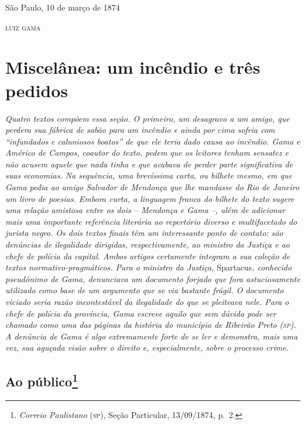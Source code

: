 \begin{flushright}
São Paulo, 10 de março de 1874

\textsc{luiz gama}
\end{flushright}

\part{Miscelânea: um incêndio e três pedidos}

\begin{argumento}
\emph{Quatro textos compõem essa seção. O primeiro, um desagravo a um
amigo, que perdera sua fábrica de sabão para um incêndio e ainda por
cima sofria com ``infundados e caluniosos boatos'' de que ele teria dado
causa ao incêndio. Gama e Américo de Campos, coautor do texto, pedem que
os leitores tenham sensatez e não acusem aquele que nada tinha e que
acabava de perder parte significativa de suas economias. Na sequência,
uma brevíssima carta, ou bilhete mesmo, em que Gama pedia ao amigo
Salvador de Mendonça que lhe mandasse do Rio de Janeiro um livro de
poesias. Embora curta, a linguagem franca do bilhete do texto sugere uma
relação amistosa entre os dois -- Mendonça e Gama --, além de adicionar
mais uma importante referência literária ao repertório diverso e
multifacetado do jurista negro. Os dois textos finais têm um
interessante ponto de contato: são denúncias de ilegalidade dirigidas,
respectivamente, ao ministro da Justiça e ao chefe de polícia da
capital. Ambos artigos certamente integram a sua coleção de textos
normativo-pragmáticos. Para o ministro da Justiça,} Spartacus\emph{,
conhecido pseudônimo de Gama, denunciava um documento forjado que fora
astuciosamente utilizado como base de um argumento que se via bastante
frágil. O documento viciado seria razão incontestável da ilegalidade do
que se pleiteava nele. Para o chefe de polícia da província, Gama
escreve aquilo que sem dúvida pode ser chamado como uma das páginas da
história do município de Ribeirão Preto (\textsc{sp}). A denúncia de Gama é algo
extremamente forte de se ler e demonstra, mais uma vez, sua aguçada
visão sobre o direito e, especialmente, sobre o processo crime.}
\end{argumento}

\chapter{Ao público\footnote{\emph{Correio Paulistano} (\textsc{sp}), Seção Particular,
  13/09/1874, p.~2.}} %

